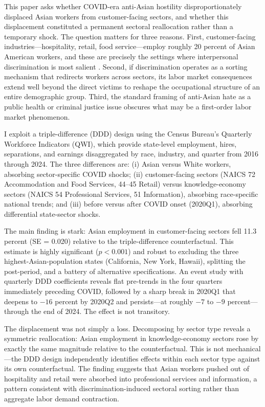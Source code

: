 \documentclass[12pt]{article}
\begin{document}
This paper asks whether COVID-era anti-Asian hostility disproportionately displaced Asian workers from customer-facing sectors, and whether this displacement constituted a permanent sectoral reallocation rather than a temporary shock. The question matters for three reasons. First, customer-facing industries---hospitality, retail, food service---employ roughly 20 percent of Asian American workers, and these are precisely the settings where interpersonal discrimination is most salient \citep{holzer1998customer}. Second, if discrimination operates as a sorting mechanism that redirects workers across sectors, its labor market consequences extend well beyond the direct victims to reshape the occupational structure of an entire demographic group. Third, the standard framing of anti-Asian hate as a public health or criminal justice issue obscures what may be a first-order labor market phenomenon.

I exploit a triple-difference (DDD) design using the Census Bureau's Quarterly Workforce Indicators (QWI), which provide state-level employment, hires, separations, and earnings disaggregated by race, industry, and quarter from 2016 through 2024. The three differences are: (i) Asian versus White workers, absorbing sector-specific COVID shocks; (ii) customer-facing sectors (NAICS 72 Accommodation and Food Services, 44--45 Retail) versus knowledge-economy sectors (NAICS 54 Professional Services, 51 Information), absorbing race-specific national trends; and (iii) before versus after COVID onset (2020Q1), absorbing differential state-sector shocks.

The main finding is stark: Asian employment in customer-facing sectors fell 11.3 percent (SE = 0.020) relative to the triple-difference counterfactual. This estimate is highly significant ($p < 0.001$) and robust to excluding the three highest-Asian-population states (California, New York, Hawaii), splitting the post-period, and a battery of alternative specifications. An event study with quarterly DDD coefficients reveals flat pre-trends in the four quarters immediately preceding COVID, followed by a sharp break in 2020Q1 that deepens to $-16$ percent by 2020Q2 and persists---at roughly $-7$ to $-9$ percent---through the end of 2024. The effect is not transitory.

The displacement was not simply a loss. Decomposing by sector type reveals a symmetric reallocation: Asian employment in knowledge-economy sectors rose by exactly the same magnitude relative to the counterfactual. This is not mechanical---the DDD design independently identifies effects within each sector type against its own counterfactual. The finding suggests that Asian workers pushed out of hospitality and retail were absorbed into professional services and information, a pattern consistent with discrimination-induced sectoral sorting rather than aggregate labor demand contraction.
\end{document}
